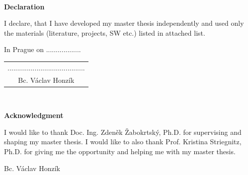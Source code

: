 \documentclass[a4paper,12pt,twoside]{report}
\newcommand{\autor}{Bc. Václav Honzík}           %
\newcommand{\vedouci}{Doc. Ing. Zdeněk Žabokrtský, Ph.D.}         %
\newcommand{\konzultant}{Prof. Kristina Striegnitz, Ph.D.} %
\begin{document}
\newpage %
\thispagestyle{empty}  %

~ %
\vfill %

{\bf Declaration} %

\vspace{0.5cm} %
I declare, that I have developed my master thesis independently and used only the materials (literature, projects, SW etc.) listed in attached list.

\vspace{5mm}In Prague on ..................\hfill  %
    \begin{tabular}{c}                               %
    ........................................\\       %
    \autor                                           %
    \end{tabular}                                    %



\newpage
\thispagestyle{empty}

~
\vfill %

{\bf Acknowledgment}

\vspace{5mm} %
I would like to thank \vedouci{} for supervising and shaping my master thesis. I would like to also thank \konzultant{} for giving me the opportunity and helping me with my master thesis.

\begin{flushright}
\autor
\end{flushright}  %

\newpage   %
\thispagestyle{empty}   %

\newbox\odstavecbox
\newlength\vyskaodstavce
\newcommand\odstavec[2]{%
    \setbox\odstavecbox=\hbox{%
         \parbox[t]{#1}{#2\vrule width 0pt depth 4pt}}%
    \global\vyskaodstavce=\dp\odstavecbox
    \box\odstavecbox}
\newcommand{\delka}{120mm} %
\end{document}
